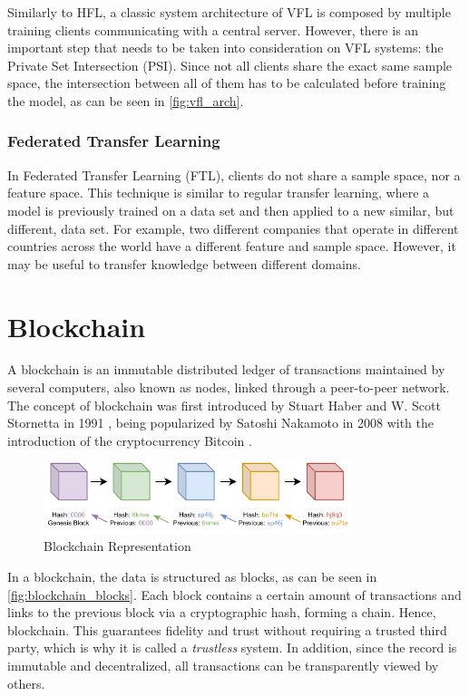 Similarly to HFL, a classic system architecture of VFL is composed by multiple training clients communicating with a central server. However, there is an important step that needs to be taken into consideration on VFL systems: the Private Set Intersection (PSI). Since not all clients share the exact same sample space, the intersection between all of them has to be calculated before training the model, as can be seen in \autoref{fig:vfl_arch}.

\subsubsection{Federated Transfer Learning}

In Federated Transfer Learning (FTL), clients do not share a sample space, nor a feature space. This technique is similar to regular transfer learning, where a model is previously trained on a data set and then applied to a new similar, but different, data set. For example, two different companies that operate in different countries across the world have a different feature and sample space. However, it may be useful to transfer knowledge between different domains.

\section{Blockchain}
\label{preliminaries:blockchain}

A blockchain is an immutable distributed ledger of transactions maintained by several computers, also known as nodes, linked through a peer-to-peer network. The concept of blockchain was first introduced by Stuart Haber and W. Scott Stornetta in 1991 \cite{10.48550/ARXIV.1810.06130}, being popularized by Satoshi Nakamoto in 2008 with the introduction of the cryptocurrency Bitcoin \cite{nakamoto2009bitcoin}.

\begin{figure}[h]
    \centering
    \includegraphics[width=0.8\textwidth]{graphics/blockchain.pdf}
    \caption{Blockchain Representation}
    \label{fig:blockchain_blocks}
\end{figure}

In a blockchain, the data is structured as blocks, as can be seen in \autoref{fig:blockchain_blocks}. Each block contains a certain amount of transactions and links to the previous block via a cryptographic hash, forming a chain. Hence, blockchain. This guarantees fidelity and trust without requiring a trusted third party, which is why it is called a \textit{trustless} system. In addition, since the record is immutable and decentralized, all transactions can be transparently viewed by others.

